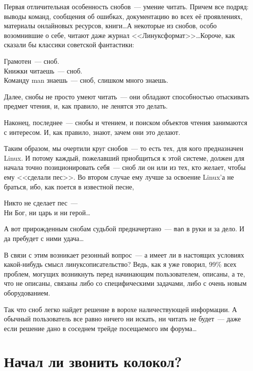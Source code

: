 Первая отличительная особенность снобов~--- умение читать. Причем все подряд: выводы команд, сообщения об ошибках, документацию во всех её проявлениях, материалы онлайновых ресурсов, книги\dots А некоторые из снобов, особо возомнившие о себе, читают даже журнал <<Линуксформат>>\dots Короче, как сказали бы классики советской фантастики:

\begin{shadequote}{}
Грамотен~--- сноб.\\
Книжки читаешь~--- сноб.\\
Команду man знаешь~--- сноб, слишком много знаешь. 
\end{shadequote}
Далее, снобы не просто умеют читать~--- они обладают способностью отыскивать предмет чтения, и, как правило, не ленятся это делать.

Наконец, последнее~--- снобы и чтением, и поиском объектов чтения занимаются с интересом. И, как правило, знают, зачем они это делают.

Таким образом, мы очертили круг снобов~--- то есть тех, для кого предназначен Linux. И потому каждый, пожелавший приобщиться к этой системе, должен для начала точно позиционировать себя~--- сноб ли он или из тех, кто желает, чтобы ему <<сделали пес>>. Во втором случае ему лучше за освоение Linux'а не браться, ибо, как поется в известной песне,

\begin{shadequote}{}
Никто не сделает пес~---\\
Ни Бог, ни царь и ни герой\dots 
\end{shadequote}
А вот прирожденным снобам судьбой предначертано~--- \texttt{man} в руки и за дело. И да пребудет с ними удача\dots

В связи с этим возникает резонный вопрос~--- а имеет ли в настоящих условиях какой-нибудь смысл линуксописательство? Ведь, как я уже говорил, 99\% всех проблем, могущих возникнуть перед начинающим пользователем, описаны, а те, что не описаны, связаны либо со специфическими задачами, либо с очень новым оборудованием.

Так что сноб легко найдет решение в ворохе наличествующей информации. А обычный пользователь все равно ничего ни искать, ни читать не будет~--- даже если решение дано в соседнем трейде посещаемого им форума\dots

\section{Начал ли звонить колокол?} 

